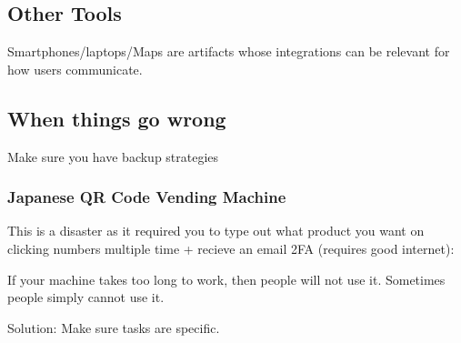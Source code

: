\subsection{Other Tools}
Smartphones/laptops/Maps are artifacts whose integrations can be relevant for how users communicate.

\subsection{When things go wrong}
Make sure you have backup strategies

\subsubsection{Japanese QR Code Vending Machine}
This is a disaster as it required you to type out what product you want on clicking numbers multiple time + recieve an email 2FA (requires good internet):
\begin{important}
If your machine takes too long to work, then people will not use it. Sometimes people simply cannot use it.
\end{important}

Solution: Make sure tasks are specific.
